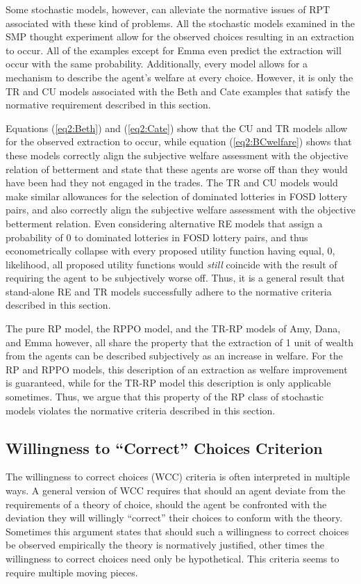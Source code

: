 \documentclass[../main.tex]{subfiles}
\begin{document}
Some stochastic models, however, can alleviate the normative issues of RPT associated with these kind of problems.
All the stochastic models examined in the SMP thought experiment allow for the observed choices resulting in an extraction to occur.
All of the examples except for Emma even predict the extraction will occur with the same probability.
Additionally, every model allows for a mechanism to describe the agent's welfare at every choice.
However, it is only the TR and CU models associated with the Beth and Cate examples that satisfy the normative requirement described in this section.

Equations (\ref{eq2:Beth}) and (\ref{eq2:Cate}) show that the CU and TR models allow for the observed extraction to occur, while equation (\ref{eq2:BCwelfare}) shows that these models correctly align the subjective welfare assessment with the objective relation of betterment and state that these agents are worse off than they would have been had they not engaged in the trades.
The TR and CU models would make similar allowances for the selection of dominated lotteries in FOSD lottery pairs, and also correctly align the subjective welfare assessment with the objective betterment relation.
Even considering alternative RE models that assign a probability of $0$ to dominated lotteries in FOSD lottery pairs, and thus econometrically collapse with every proposed utility function having equal, $0$, likelihood, all proposed utility functions would \textit{still} coincide with the result of requiring the agent to be subjectively worse off.
Thus, it is a general result that stand-alone RE and TR models successfully adhere to the normative criteria described in this section.

The pure RP model, the RPPO model, and the TR-RP models of Amy, Dana, and Emma however, all share the property that the extraction of 1 unit of wealth from the agents can be described subjectively as an increase in welfare.
For the RP and RPPO models, this description of an extraction as welfare improvement is guaranteed, while for the TR-RP model this description is only applicable sometimes.
Thus, we argue that this property of the RP class of stochastic models violates the normative criteria described in this section.


\subsection{Willingness to \enquote{Correct} Choices Criterion}

The willingness to correct choices (WCC) criteria is often interpreted in multiple ways.
A general version of WCC requires that should an agent deviate from the requirements of a theory of choice, should the agent be confronted with the deviation they will willingly \enquote{correct} their choices to conform with the theory.
Sometimes this argument states that should such a willingness to correct choices be observed empirically the theory is normatively justified, other times the willingness to correct choices need only be hypothetical.
This criteria seems to require multiple moving pieces. 
\end{document}
